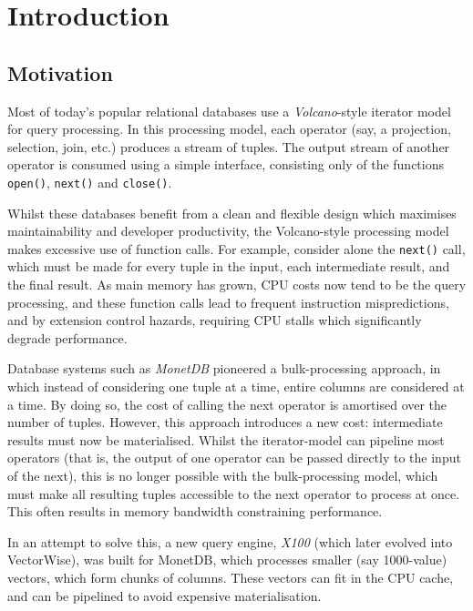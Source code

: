 \chapter{Introduction}

\section{Motivation}

Most of today's popular relational databases use a \emph{Volcano}-style iterator model \cite{Graefe:1994:VEP:627290.627558} for query processing. In this processing model, each operator (say, a projection, selection, join, etc.) produces a stream of tuples. The output stream of another operator is consumed using a simple interface, consisting only of the functions \texttt{open()}, \texttt{next()} and \texttt{close()}.

Whilst these databases benefit from a clean and flexible design which maximises maintainability and developer productivity, the Volcano-style processing model makes excessive use of function calls. For example, consider alone the \texttt{next()} call, which must be made for every tuple in the input, each intermediate result, and the final result. As main memory has grown, CPU costs now tend to be the query processing, and these function calls lead to frequent instruction mispredictions, and by extension control hazards, requiring CPU stalls which significantly degrade performance.

Database systems such as \emph{MonetDB} \cite{Boncz:2008:BMW:1409360.1409380} pioneered a bulk-processing approach, in which instead of considering one tuple at a time, entire columns are considered at a time. By doing so, the cost of calling the next operator is amortised over the number of tuples. However, this approach introduces a new cost: intermediate results must now be materialised. Whilst the iterator-model can pipeline most operators (that is, the output of one operator can be passed directly to the input of the next), this is no longer possible with the bulk-processing model, which must make all resulting tuples accessible to the next operator to process at once. This often results in memory bandwidth constraining performance.

In an attempt to solve this, a new query engine, \emph{X100} \cite{DBLP:conf/cidr/BonczZN05} (which later evolved into VectorWise), was built for MonetDB, which processes smaller (say 1000-value) vectors, which form chunks of columns. These vectors can fit in the CPU cache, and can be pipelined to avoid expensive materialisation.

